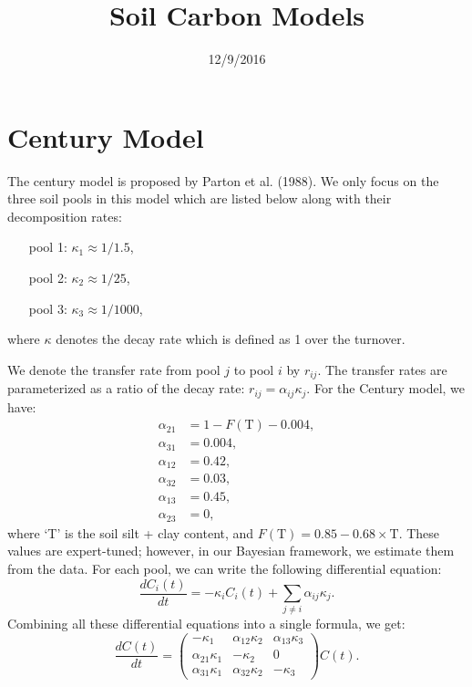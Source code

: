 \documentclass[10pt,a4paper]{article}
\title{Soil Carbon Models}
\date{12/9/2016}
\begin{document}
\maketitle
\section*{Century Model}
The century model is proposed by Parton et al. (1988). We only focus on the three soil pools in this model which are listed below along with their decomposition rates:

\begin{itemize}
\item[pool 1:]   $\kappa_1 \approx 1/1.5$,
\item[pool 2:]  $\kappa_2 \approx 1/25$,
\item[pool 3:]   $\kappa_3 \approx 1/1000$,
\end{itemize}
where $\kappa$ denotes the decay rate which is defined as 1 over the turnover. 

We denote the transfer rate from pool $j$ to pool $i$ by $r_{ij}$. The transfer rates are parameterized as a ratio of the decay rate: $r_{ij} = \alpha_{ij} \kappa_j$. For the Century model, we have:
\begin{align*}
\alpha_{21} & = 1 - F(\text{T}) - 0.004, \\
\alpha_{31} & = 0.004, \\
\alpha_{12} & = 0.42, \\
\alpha_{32} & = 0.03, \\
\alpha_{13} & = 0.45, \\
\alpha_{23} & = 0,
\end{align*}
where `T' is the soil silt + clay content, and $F(\text{T}) = 0.85 - 0.68 \times \text{T}$. These values are expert-tuned; however, in our Bayesian framework, we estimate them from the data. For each pool, we can write the following differential equation:
\begin{equation*}
\frac{d C_i(t)}{dt} = -\kappa_i C_i(t) + \sum_{j\neq i} \alpha_{ij} \kappa_j.
\end{equation*}
Combining all these differential equations into a single formula, we get:
\begin{equation*}
\frac{dC(t)}{dt} = 
   \left( {\begin{array}{ccc}
   -\kappa_1 & \alpha_{12} \kappa_2 & \alpha_{13}\kappa_3 \\
    \alpha_{21}\kappa_1 & -\kappa_2& 0  \\
    \alpha_{31} \kappa_1 & \alpha_{32} \kappa_2 & -\kappa_3    
   \end{array} } \right) C(t).
\end{equation*}
\end{document}
